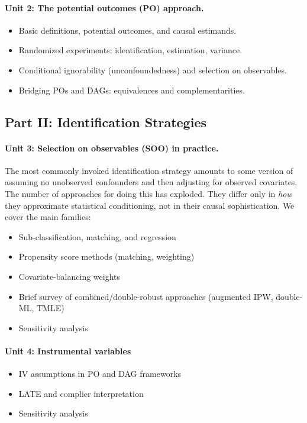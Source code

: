 \documentclass[PS]{syllabus}
\begin{document}
\begin{syllabus}
\paragraph{Unit 2: The potential outcomes (PO) approach.}
\begin{itemize}
\item Basic definitions, potential outcomes, and causal estimands.
\item Randomized experiments: identification, estimation, variance.
\item Conditional ignorability (unconfoundedness) and selection on observables.
\item Bridging POs and DAGs: equivalences and complementarities.
\end{itemize}

\subsection*{Part II: Identification Strategies}

\paragraph{Unit 3: Selection on observables (SOO) in practice.}

The most commonly invoked identification strategy amounts to some version of assuming no unobserved confounders and then adjusting for observed covariates. The number of approaches for doing this has exploded. They differ only in \textit{how} they approximate statistical conditioning, not in their causal sophistication. We cover the main families:
\begin{itemize}
\item Sub-classification, matching, and regression
\item Propensity score methods (matching, weighting)
\item Covariate-balancing weights
\item Brief survey of combined/double-robust approaches (augmented IPW, double-ML, TMLE)
\item Sensitivity analysis
\end{itemize}

\paragraph{Unit 4: Instrumental variables}
\begin{itemize}
\item IV assumptions in PO and DAG frameworks
\item LATE and complier interpretation
\item Sensitivity analysis
\end{itemize}


\end{syllabus}
\end{document}
